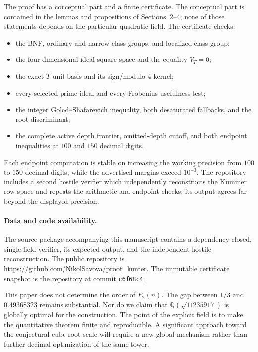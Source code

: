 \documentclass[11pt]{article}
\theoremstyle{definition}
\theoremstyle{remark}
\newcommand{\Q}{\mathbb Q}
\begin{document}
The proof has a conceptual part and a finite certificate.  The conceptual
part is contained in the lemmas and propositions of Sections~2--4; none of
those statements depends on the particular quadratic field.  The certificate
checks:
\begin{itemize}
\item the BNF, ordinary and narrow class groups, and localized class group;
\item the four-dimensional ideal-square space and the equality $V_T=0$;
\item the exact $T$-unit basis and its sign/modulo-$4$ kernel;
\item every selected prime ideal and every Frobenius usefulness test;
\item the integer Golod--Shafarevich inequality, both desaturated fallbacks,
and the root discriminant;
\item the complete active depth frontier, omitted-depth cutoff, and both
endpoint inequalities at $100$ and $150$ decimal digits.
\end{itemize}
Each endpoint computation is stable on increasing the working precision from
$100$ to $150$ decimal digits, while the advertised margins exceed $10^{-3}$.
The repository includes a second hostile verifier which independently
reconstructs the Kummer row space and repeats the arithmetic and endpoint
checks; its output agrees far beyond the displayed precision.

\paragraph{Data and code availability.}
The source package accompanying this manuscript contains a dependency-closed,
single-field verifier, its expected output, and the independent hostile
reconstruction.  The public repository is
\url{https://github.com/NikolSavova/proof_hunter}.  The immutable certificate
snapshot is the
\href{https://github.com/NikolSavova/proof_hunter/tree/c6f68c4b8dc458242f317f2c5f3d76ce4df36e5f/phase2/loop/erdos1208/paper/certificate}%
{repository at commit \texttt{c6f68c4}}.

This paper does not determine the order of $F_2(n)$.  The gap between
$1/3$ and $0.49368323$ remains substantial.  Nor do we claim that
$\Q(\sqrt{11235917})$ is globally optimal for the construction.  The point
of the explicit field is to make the quantitative theorem finite and
reproducible.  A significant approach toward the conjectural cube-root
scale will require a new global mechanism rather than further decimal
optimization of the same tower.



\end{document}
